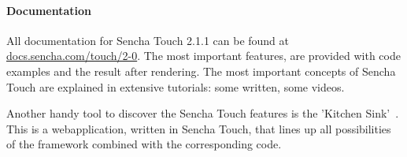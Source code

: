\documentclass[a4paper]{article}
\newcommand{\code}[1]{\texttt{#1}}
\renewcommand{\url}[1]{\href{http://#1}{#1}}
\begin{document}

\paragraph{Documentation}
All documentation for Sencha Touch 2.1.1 can be found at \url{docs.sencha.com/touch/2-0}.  The most important features,  are provided with code examples and the result after rendering.  The most important concepts of Sencha Touch are explained in extensive tutorials:  some written, some videos.  

Another handy tool to discover the Sencha Touch features is the 'Kitchen Sink'~\cite{Inc.2013}.  This is a webapplication,  written in Sencha Touch,  that lines up all possibilities of the framework combined with the corresponding code.

% 

\end{document}
